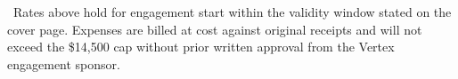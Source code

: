 \vspace{0.4cm}

\begin{tcolorbox}[colback=lightbg, colframe=bordercolor, boxrule=0.6pt, arc=2pt,
  left=12pt, right=12pt, top=8pt, bottom=8pt]
  \small\color{darktext}
  \faFile\ Rates above hold for engagement start within the validity window
  stated on the cover page. Expenses are billed at cost against original
  receipts and will not exceed the \$14{,}500 cap without prior written
  approval from the Vertex engagement sponsor.
\end{tcolorbox}

